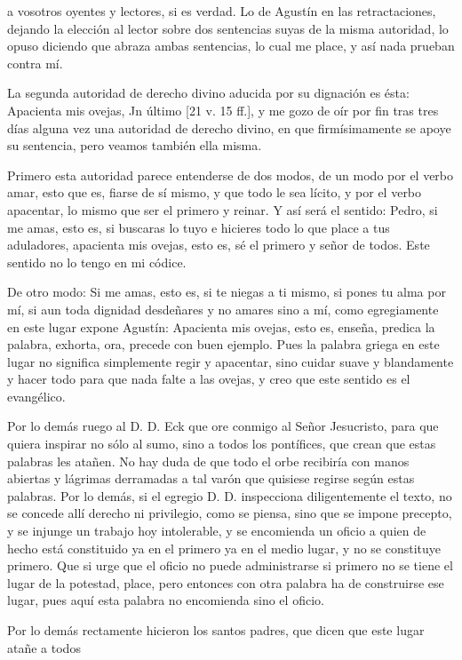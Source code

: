 a vosotros oyentes y lectores, si es verdad. Lo de Agustín en las retractaciones, dejando la elección al lector sobre dos sentencias suyas de la misma autoridad, lo opuso diciendo que abraza ambas sentencias, lo cual me place, y así nada prueban contra mí.

La segunda autoridad de derecho divino aducida por su dignación es ésta: Apacienta mis ovejas, Jn último [21 v. 15 ff.], y me gozo de oír por fin tras tres días alguna vez una autoridad de derecho divino, en que firmísimamente se apoye su sentencia, pero veamos también ella misma.

Primero esta autoridad parece entenderse de dos modos, de un modo por el verbo amar, esto que es, fiarse de sí mismo, y que todo le sea lícito, y por el verbo apacentar, lo mismo que ser el primero y reinar. Y así será el sentido: Pedro, si me amas, esto es, si buscaras lo tuyo e hicieres todo lo que place a tus aduladores, apacienta mis ovejas, esto es, sé el primero y señor de todos. Este sentido no lo tengo en mi códice.

De otro modo: Si me amas, esto es, si te niegas a ti mismo, si pones tu alma por mí, si aun toda dignidad desdeñares y no amares sino a mí, como egregiamente en este lugar expone Agustín: Apacienta mis ovejas, esto es, enseña, predica la palabra, exhorta, ora, precede con buen ejemplo. Pues la palabra griega en este lugar no significa simplemente regir y apacentar, sino cuidar suave y blandamente y hacer todo para que nada falte a las ovejas, y creo que este sentido es el evangélico.

Por lo demás ruego al D. D. Eck que ore conmigo al Señor Jesucristo, para que quiera inspirar no sólo al sumo, sino a todos los pontífices, que crean que estas palabras les atañen. No hay duda de que todo el orbe recibiría con manos abiertas y lágrimas derramadas a tal varón que quisiese regirse según estas palabras. Por lo demás, si el egregio D. D. inspecciona diligentemente el texto, no se concede allí derecho ni privilegio, como se piensa, sino que se impone precepto, y se injunge un trabajo hoy intolerable, y se encomienda un oficio a quien de hecho está constituido ya en el primero ya en el medio lugar, y no se constituye primero. Que si urge que el oficio no puede administrarse si primero no se tiene el lugar de la potestad, place, pero entonces con otra palabra ha de construirse ese lugar, pues aquí esta palabra no encomienda sino el oficio.

Por lo demás rectamente hicieron los santos padres, que dicen que este lugar atañe a todos


